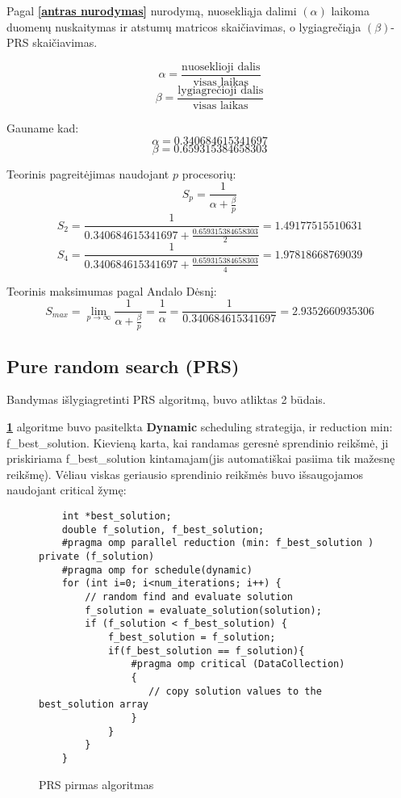 \documentclass[a4paper,10pt]{article}
\begin{document}
Pagal \textbf{\ref{antras nurodymas}} nurodymą, nuosekliąja dalimi $(\alpha)$ laikoma duomenų nuskaitymas ir atstumų matricos skaičiavimas, o lygiagrečiąja $(\beta)$- PRS skaičiavimas.

$$ \alpha = \frac {\text{nuoseklioji dalis}} {\text{visas laikas}} $$
$$ \beta = \frac {\text{lygiagrečioji dalis}} {\text{visas laikas}} $$

Gauname kad: $$\alpha = \num{0.340684615341697}$$ $$ \beta = \num{0.659315384658303} $$

Teorinis pagreitėjimas naudojant $p$ procesorių:
$$S_p = \frac {1} {\alpha + \frac{\beta} {p}} $$
$$S_2 = \frac {1} { \num{0.340684615341697}+ \frac{\num{0.659315384658303}} {2}}  = \num{1.49177515510631}$$
$$S_4 = \frac {1} { \num{0.340684615341697} + \frac{\num{0.659315384658303}} {4}}  = \num{1.97818668769039}$$

Teorinis maksimumas pagal Andalo Dėsnį:
$$ S_{max} = \lim_{p \rightarrow \infty} \frac {1} {\alpha + \frac {\beta} {p}} = \frac {1} {\alpha} = \frac {1} { \num{0.340684615341697}}= \num{2.9352660935306}$$
\newpage
\subsection{Pure random search (PRS)}
Bandymas išlygiagretinti PRS algoritmą, buvo atliktas 2 būdais.

\textbf{\ref{PRS1}} algoritme buvo pasitelkta \textbf{Dynamic} scheduling strategija, ir reduction min: f\_best\_solution. Kievieną karta, kai randamas geresnė sprendinio reikšmė, ji priskiriama f\_best\_solution kintamajam(jis automatiškai pasiima tik mažesnę reikšmę). Vėliau viskas  geriausio sprendinio reikšmės buvo išsaugojamos naudojant critical žymę:
\begin{figure}[ht]
	\begin{verbatim}
    int *best_solution; 
    double f_solution, f_best_solution; 
    #pragma omp parallel reduction (min: f_best_solution ) private (f_solution)
    #pragma omp for schedule(dynamic)
    for (int i=0; i<num_iterations; i++) {
        // random find and evaluate solution
        f_solution = evaluate_solution(solution);
        if (f_solution < f_best_solution) { 
            f_best_solution = f_solution;
            if(f_best_solution == f_solution){
                #pragma omp critical (DataCollection)
                {
                   // copy solution values to the best_solution array
                }
            }
        }
    }
\end{verbatim}
	\caption{PRS pirmas algoritmas}
	\label {PRS1}
\end{figure}
\end{document}
